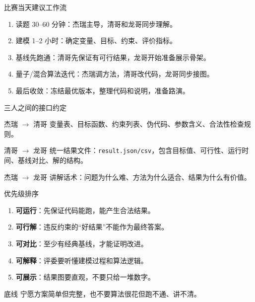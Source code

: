 \documentclass[aspectratio=169]{beamer}
\newcommand{\key}[1]{\textcolor{PlanOrange}{\textbf{#1}}}
\begin{document}
\begin{frame}{比赛当天建议工作流}
\small
\begin{enumerate}
  \item 读题 30--60 分钟：杰瑞主导，清哥和龙哥同步理解。
  \item 建模 1--2 小时：确定变量、目标、约束、评价指标。
  \item 基线先跑通：清哥先保证有可行结果，龙哥开始准备展示骨架。
  \item 量子/混合算法迭代：杰瑞调方法，清哥改代码，龙哥同步接图。
  \item 最后收敛：冻结最优版本，整理代码和说明，准备路演。
\end{enumerate}
\end{frame}

\begin{frame}{三人之间的接口约定}
\small
\begin{block}{杰瑞 $\rightarrow$ 清哥}
  变量表、目标函数、约束列表、伪代码、参数含义、合法性检查规则。
\end{block}

\begin{block}{清哥 $\rightarrow$ 龙哥}
  统一结果文件：\texttt{result.json/csv}，包含目标值、可行性、运行时间、基线对比、解的结构。
\end{block}

\begin{block}{杰瑞 $\rightarrow$ 龙哥}
  讲解话术：问题为什么难、方法为什么适合、结果为什么有价值。
\end{block}
\end{frame}

\begin{frame}{优先级排序}
\small
\begin{enumerate}
  \item \key{可运行}：先保证代码能跑，能产生合法结果。
  \item \key{可行解}：违反约束的“好结果”不能作为最终答案。
  \item \key{可对比}：至少有经典基线，才能证明改进。
  \item \key{可解释}：评委要听懂建模过程和算法逻辑。
  \item \key{可展示}：结果图要直观，不要只给一堆数字。
\end{enumerate}

\begin{block}{底线}
  宁愿方案简单但完整，也不要算法很花但跑不通、讲不清。
\end{block}
\end{frame}
\end{document}
